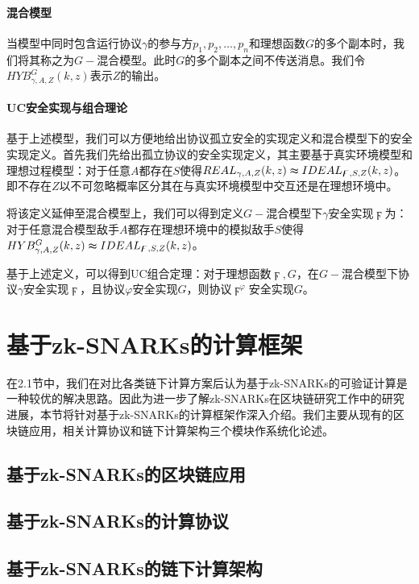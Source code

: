 \paragraph{混合模型}
当模型中同时包含运行协议$\gamma$的参与方$p_1, p_2, \dots , p_n$和理想函数$G$的多个副本时，我们将其称之为$G-$混合模型。此时$G$的多个副本之间不传送消息。我们令$HYB^G_{\gamma, A, Z}(k, z)$表示$Z$的输出。
\paragraph{UC安全实现与组合理论}
基于上述模型，我们可以方便地给出协议孤立安全的实现定义和混合模型下的安全实现定义。首先我们先给出孤立协议的安全实现定义，其主要基于真实环境模型和理想过程模型：对于任意$A$都存在$S$使得$REAL_{\gamma, A, Z}(k, z) \thickapprox IDEAL_{\digamma, S, Z}(k, z)$。即不存在$Z$以不可忽略概率区分其在与真实环境模型中交互还是在理想环境中。

将该定义延伸至混合模型上，我们可以得到定义$G-$混合模型下$\gamma$安全实现$\digamma$为：对于任意混合模型敌手$A$都存在理想环境中的模拟敌手$S$使得$HYB^G_{\gamma, A, Z}(k, z) \thickapprox IDEAL_{\digamma, S, Z}(k, z)$。

基于上述定义，可以得到UC组合定理：对于理想函数$\digamma, G$，在$G-$混合模型下协议$\gamma$安全实现$\digamma$，且协议$\varphi$安全实现$G$，则协议$\digamma^\varphi$安全实现$G$。
\section{基于zk-SNARKs的计算框架}
在2.1节中，我们在对比各类链下计算方案后认为基于zk-SNARKs的可验证计算是一种较优的解决思路。因此为进一步了解zk-SNARKs在区块链研究工作中的研究进展，本节将针对基于zk-SNARKs的计算框架作深入介绍。我们主要从现有的区块链应用，相关计算协议和链下计算架构三个模块作系统化论述。
\subsection{基于zk-SNARKs的区块链应用}

\subsection{基于zk-SNARKs的计算协议}

\subsection{基于zk-SNARKs的链下计算架构}
